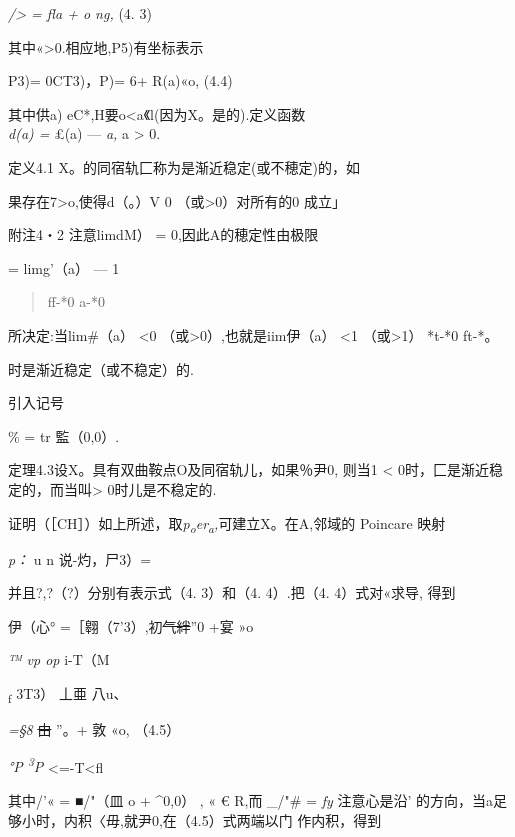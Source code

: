 \documentclass{article}
\begin{document}
\emph{/\textgreater{} = fla + o ng,} (4. 3)

其中«\textgreater{}0.相应地,P5)有坐标表示

P3)= 0CT3)，P)= 6+ R(a)«o, (4.4)

其中供a) eC*,H要o\textless{}a《l(因为X。是的).定义函数\\
\emph{d(a) =} £(a) --- \emph{a,} a \textgreater{} 0.

定义4.1 X。的同宿轨匚称为是渐近稳定(或不穂定)的，如

果存在7\textgreater{}o,使得d（。）V 0 （或\textgreater{}0）对所有的0
成立」

附注4・2 注意limdM） = 0,因此A的穂定性由极限

= limg'（a） --- 1

\begin{quote}
ff-*0 a-*0
\end{quote}

所决定:当lim\#（a） \textless{}0 （或\textgreater{}0）,也就是iim伊（a）
\textless{}1 （或\textgreater{}1） *t-*0 ft-*。

时是渐近稳定（或不稳定）的.

引入记号

\% = tr 監（0,0）.

定理4.3设X。具有双曲鞍点O及同宿轨儿，如果％尹0, 则当1 \textless{}
0时，匚是渐近稳定的，而当叫\textgreater{} 0时儿是不稳定的.

证明（［CH］）如上所述，取\emph{p\textsubscript{o}er\textsubscript{a},}可建立X。在A,邻域的
Poincare 映射

\emph{p：} u n 说-灼，尸3）=

并且?,?（?）分别有表示式（4. 3）和（4. 4）.把（4. 4）式对«求导, 得到

伊（心° =［翱（7'3）,初\sout{气絆}''0 +宴 »o

\emph{™ vp op} i-T（M

\textsubscript{f} {3T3）} 丄亜 八u、

\emph{=§8} \sout{由} ''。+ 敦 «o, （4.5）

\emph{°P \textsuperscript{3}P} \textless{}=-T\textless{}fl

其中/'« = ■/"（皿 o + \^{}0,0） , « € R,而 \_/"\# = \emph{fy}
注意心是沿' 的方向，当a足够小时，内积〈毋,就尹0,在（4.5）式两端以门
作内积，得到
\end{document}
